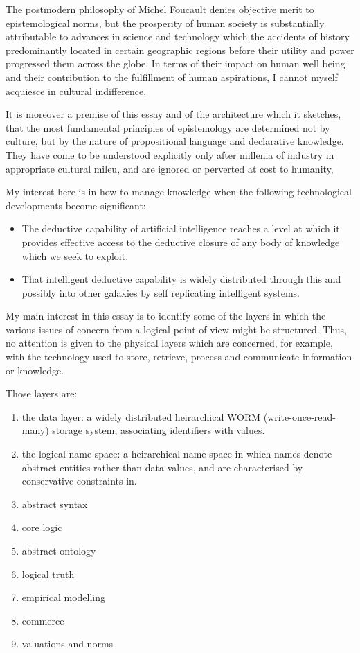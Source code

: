 \documentclass[10pt,titlepage]{book}
\begin{document}
The postmodern philosophy of Michel Foucault denies objective merit to epistemological norms, but the prosperity of human society is substantially attributable to advances in science and technology which the accidents of history predominantly located in certain geographic regions before their utility and power progressed them across the globe.
In terms of their impact on human well being and their contribution to the fulfillment of human aspirations, I cannot myself acquiesce in cultural indifference.

It is moreover a premise of this essay and of the architecture which it sketches, that the most fundamental principles of epistemology are determined not by culture, but by the nature of propositional language and declarative knowledge.
They have come to be understood explicitly only after millenia of industry in appropriate cultural mileu, and are ignored or perverted at cost to humanity,

My interest here is in how to manage knowledge when the following technological developments become significant:

\begin{itemize}
\item The deductive capability of artificial intelligence reaches a level at which it provides effective access to the deductive closure of any body of knowledge which we seek to exploit.
\item That intelligent deductive capability is widely distributed through this and possibly into other galaxies by self replicating intelligent systems.
\end{itemize}

My main interest in this essay is to identify some of the layers in which the various issues of concern from a logical point of view might be structured.
Thus, no attention is given to the physical layers which are concerned, for example, with the technology used to store, retrieve, process and communicate information or knowledge.

Those layers are:

\begin{enumerate}
\item the data layer: a widely distributed heirarchical WORM (write-once-read-many) storage system, associating identifiers with values.
\item the logical name-space: a heirarchical name space in which names denote abstract entities rather than data values, and are characterised by conservative constraints in.
\item abstract syntax
\item core logic
\item abstract ontology
\item logical truth
\item empirical modelling
\item commerce
\item valuations and norms
\end{enumerate}
\end{document}
